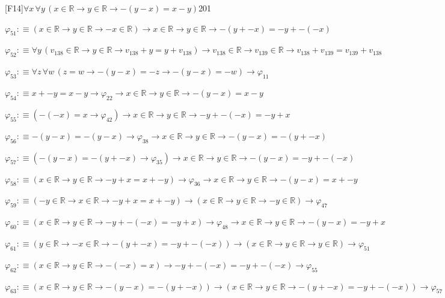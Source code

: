 \begin{fullproof}{[F14]}{$\forall x\,\forall y\,(x \in \mathbb{R} \to y \in \mathbb{R} \to -(y - x) = x - y)$}{201}
\begin{abbrevlist}
\item $\varphi_{51} :\equiv (x \in \mathbb{R} \to y \in \mathbb{R} \to -x \in \mathbb{R}) \to x \in \mathbb{R} \to y \in \mathbb{R} \to -(y + -x) = -y + -(-x)$
\item $\varphi_{52} :\equiv \forall y\,(v_{138} \in \mathbb{R} \to y \in \mathbb{R} \to v_{138} + y = y + v_{138}) \to v_{138} \in \mathbb{R} \to v_{139} \in \mathbb{R} \to v_{138} + v_{139} = v_{139} + v_{138}$
\item $\varphi_{53} :\equiv \forall z\,\forall w\,(z = w \to -(y - x) = -z \to -(y - x) = -w) \to \varphi_{11}$
\item $\varphi_{54} :\equiv x + -y = x - y \to \varphi_{22} \to x \in \mathbb{R} \to y \in \mathbb{R} \to -(y - x) = x - y$
\item $\varphi_{55} :\equiv (-(-x) = x \to \varphi_{42}) \to x \in \mathbb{R} \to y \in \mathbb{R} \to -y + -(-x) = -y + x$
\item $\varphi_{56} :\equiv -(y - x) = -(y - x) \to \varphi_{38} \to x \in \mathbb{R} \to y \in \mathbb{R} \to -(y - x) = -(y + -x)$
\item $\varphi_{57} :\equiv (-(y - x) = -(y + -x) \to \varphi_{35}) \to x \in \mathbb{R} \to y \in \mathbb{R} \to -(y - x) = -y + -(-x)$
\item $\varphi_{58} :\equiv (x \in \mathbb{R} \to y \in \mathbb{R} \to -y + x = x + -y) \to \varphi_{36} \to x \in \mathbb{R} \to y \in \mathbb{R} \to -(y - x) = x + -y$
\item $\varphi_{59} :\equiv (-y \in \mathbb{R} \to x \in \mathbb{R} \to -y + x = x + -y) \to (x \in \mathbb{R} \to y \in \mathbb{R} \to -y \in \mathbb{R}) \to \varphi_{47}$
\item $\varphi_{60} :\equiv (x \in \mathbb{R} \to y \in \mathbb{R} \to -y + -(-x) = -y + x) \to \varphi_{48} \to x \in \mathbb{R} \to y \in \mathbb{R} \to -(y - x) = -y + x$
\item $\varphi_{61} :\equiv (y \in \mathbb{R} \to -x \in \mathbb{R} \to -(y + -x) = -y + -(-x)) \to (x \in \mathbb{R} \to y \in \mathbb{R} \to y \in \mathbb{R}) \to \varphi_{51}$
\item $\varphi_{62} :\equiv (x \in \mathbb{R} \to y \in \mathbb{R} \to -(-x) = x) \to -y + -(-x) = -y + -(-x) \to \varphi_{55}$
\item $\varphi_{63} :\equiv (x \in \mathbb{R} \to y \in \mathbb{R} \to -(y - x) = -(y + -x)) \to (x \in \mathbb{R} \to y \in \mathbb{R} \to -(y + -x) = -y + -(-x)) \to \varphi_{57}$
\end{abbrevlist}
\end{fullproof}
